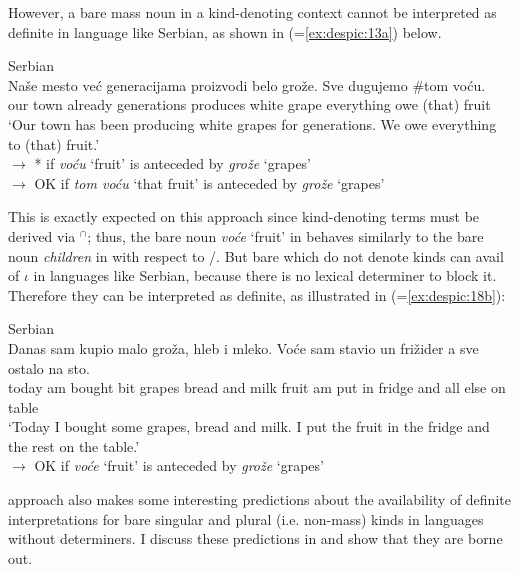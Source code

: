 \documentclass[output=paper,
modfonts
]{langscibook}
\begin{document}
	However, a bare mass noun in a kind-denoting context cannot be interpreted as definite in
	language like Serbian, as shown in  (=\ref{ex:despic:13a}) below. 
	
	\ea \label{ex:despic:33}
	Serbian \\
	\gll 
	{Na\v se} {mesto} {ve\'c} {generacijama} {proizvodi} {belo} {gro\v z\dj e}. {Sve} {dugujemo} {\textnormal{\#}{\op}tom{\cp}} {vo\'cu}. \\
	our town already generations produces white grape everything owe \phantom{\#}(that) fruit \\ 
	\glt `Our town has been producing white grapes for generations. We owe everything to (that) fruit.' \\
	$\rightarrow$ * if \textit{vo\'cu} `fruit' is anteceded by \textit{gro\v z\dj e} `grapes' \\
	$\rightarrow$ OK if \textit{tom vo\'cu} `that fruit' is anteceded by \textit{gro\v z\dj e} `grapes' 
	\z 
	
	This is exactly expected on this approach since kind-denoting terms must be derived via $^\cap$; thus, the bare noun \textit{vo\'ce} `fruit' in  behaves similarly to the bare noun \textit{children} in  with respect to /. But bare  which do not denote kinds can avail of $\iota$ in languages like Serbian, because there is no lexical determiner to block it. Therefore they can be interpreted as definite, as illustrated in  (=\ref{ex:despic:18b}):
	
	\ea \label{ex:despic:34}
	Serbian \\
	\gll 
	{Danas} {sam} {kupio} {malo} {gro\v z\dj a}, {hleb} {i} {mleko}. {Vo\'ce} {sam} {stavio} {un} {fri\v zider} {a} {sve} {ostalo} {na} {sto}. \\
	today am bought bit grapes bread and milk fruit am put in fridge and all else on table \\ 
	\glt `Today I bought some grapes, bread and milk. I put the fruit in the fridge and the rest on the table.' \\
	$\rightarrow$ OK if \textit{vo\'ce} `fruit' is anteceded by \textit{gro\v z\dj e} `grapes' 
	\z 
	
	 approach also makes some interesting predictions about the availability of definite interpretations for bare singular and plural (i.e. non-mass) kinds in languages without determiners. I discuss these predictions in  and show that they are borne out.
	
\end{document}
